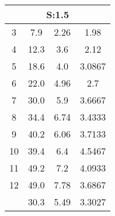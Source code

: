 
	\begin{table}[H]
		\begin{tabular}{c|ccc}
			\multicolumn{4}{c}{S:1.5}\\\hline
			3 & 7.9 & 2.26 & 1.98\\
			4 & 12.3 & 3.6 & 2.12\\
			5 & 18.6 & 4.0 & 3.0867\\
			6 & 22.0 & 4.96 & 2.7\\
			7 & 30.0 & 5.9 & 3.6667\\
			8 & 34.4 & 6.74 & 3.4333\\
			9 & 40.2 & 6.06 & 3.7133\\
			10 & 39.4 & 6.4 & 4.5467\\
			11 & 49.2 & 7.2 & 4.0933\\
			12 & 49.0 & 7.78 & 3.6867\\
			\hline
			& 30.3 & 5.49 & 3.3027\\
		\end{tabular}
	\end{table}